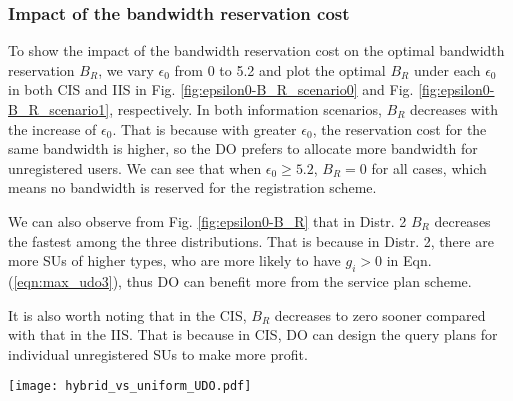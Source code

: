 \documentclass[journal]{IEEEtran}
\begin{document}
\subsubsection{Impact of the bandwidth reservation cost}

To show the impact of the bandwidth reservation cost on the optimal bandwidth reservation
$B_R$, we vary $\epsilon_0$ from 0 to 5.2 and plot the optimal $B_R$ under each $\epsilon_0$ in both CIS and IIS in Fig. \ref{fig:epsilon0-B_R_scenario0} and Fig. \ref{fig:epsilon0-B_R_scenario1}, respectively. In both information scenarios, $B_R$ decreases with the increase of $\epsilon_0$. That is because with greater $\epsilon_0$, the reservation cost for the same bandwidth is higher, so the DO prefers to allocate more bandwidth for unregistered users. We can see that when $\epsilon_0\geq 5.2$, $B_R=0$ for all cases, which means no bandwidth is reserved for the registration scheme.

We can also observe from Fig. \ref{fig:epsilon0-B_R} that in Distr. 2 $B_R$ decreases the fastest among the three distributions. That is because in Distr. 2, there are more SUs of higher types, who are more likely to have $g_i>0$ in Eqn. (\ref{eqn:max_udo3}), thus DO can benefit more from the service plan scheme.

It is also worth noting that in the CIS, $B_R$ decreases to zero sooner compared with that in the IIS. That is because in CIS, DO can design the query plans for individual unregistered SUs to make more profit.

\begin{figure*}[tp]
\centering
\begin{minipage}{2.0in}
\centering
\texttt{[image: hybrid\_vs\_uniform\_UDO.pdf]}
\caption{Comparison between hybrid and uniform pricing.}
\label{fig:hybrid}
\end{minipage}
\hspace{1.2cm}
\begin{minipage}{4.0in}
\centering
{}\hspace{0.0cm}
\caption{Impact of bandwidth reservation cost.}
\label{fig:epsilon0-B_R}
\vspace{-0.0cm}
\end{minipage}
\end{figure*}
\end{document}
